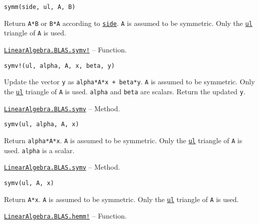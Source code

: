 \begin{adjustwidth}{2em}{0pt}


\begin{verbatim}
symm(side, ul, A, B)
\end{verbatim}

Return \texttt{A*B} or \texttt{B*A} according to \hyperlink{3128026147631247774}{\texttt{side}}. \texttt{A} is assumed to be symmetric. Only the \hyperlink{13880289478825450693}{\texttt{ul}} triangle of \texttt{A} is used.



\end{adjustwidth}
\hypertarget{11756106038468185414}{} 
\hyperlink{11756106038468185414}{\texttt{LinearAlgebra.BLAS.symv!}}  -- {Function.}

\begin{adjustwidth}{2em}{0pt}


\begin{verbatim}
symv!(ul, alpha, A, x, beta, y)
\end{verbatim}

Update the vector \texttt{y} as \texttt{alpha*A*x + beta*y}. \texttt{A} is assumed to be symmetric. Only the \hyperlink{13880289478825450693}{\texttt{ul}} triangle of \texttt{A} is used. \texttt{alpha} and \texttt{beta} are scalars. Return the updated \texttt{y}.



\end{adjustwidth}
\hypertarget{9719310770398023656}{} 
\hyperlink{9719310770398023656}{\texttt{LinearAlgebra.BLAS.symv}}  -- {Method.}

\begin{adjustwidth}{2em}{0pt}


\begin{verbatim}
symv(ul, alpha, A, x)
\end{verbatim}

Return \texttt{alpha*A*x}. \texttt{A} is assumed to be symmetric. Only the \hyperlink{13880289478825450693}{\texttt{ul}} triangle of \texttt{A} is used. \texttt{alpha} is a scalar.



\end{adjustwidth}
\hypertarget{5603412151724289616}{} 
\hyperlink{5603412151724289616}{\texttt{LinearAlgebra.BLAS.symv}}  -- {Method.}

\begin{adjustwidth}{2em}{0pt}


\begin{verbatim}
symv(ul, A, x)
\end{verbatim}

Return \texttt{A*x}. \texttt{A} is assumed to be symmetric. Only the \hyperlink{13880289478825450693}{\texttt{ul}} triangle of \texttt{A} is used.



\end{adjustwidth}
\hypertarget{16247072505934468966}{} 
\hyperlink{16247072505934468966}{\texttt{LinearAlgebra.BLAS.hemm!}}  -- {Function.}

